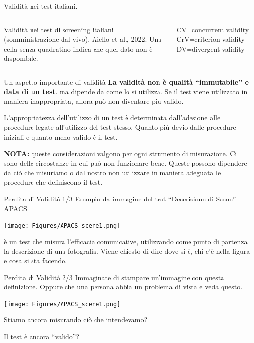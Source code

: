 \documentclass[
  ignorenonframetext,
]{beamer}
\begin{document}
\begin{frame}{Validità nei test italiani.}
\begin{columns}
Validità nei test di screening italiani (somministrazione dal vivo).
Aiello et al., 2022. Una cella senza quadratino indica che quel dato non è disponibile.

\vspace{2em}

CV=concurrent validity
CrV=criterion validity
DV=divergent validity

\end{columns}
\end{frame}

\begin{frame}{Un aspetto importante di validità}
\label{un-aspetto-importante-di-validituxe0}
\textbf{La validità non è qualità “immutabile” e data di un test}. ma
dipende da come lo si utilizza. Se il test viene utilizzato in maniera
inappropriata, allora può non diventare più valido.

L'appropriatezza dell'utilizzo di un test è determinata dall'adesione
alle procedure legate all'utilizzo del test stesso. Quanto più devio
dalle procedure iniziali e quanto meno valido è il test.

\pause

\textbf{NOTA:} queste considerazioni valgono per ogni strumento di
misurazione. Ci sono delle circostanze in cui può non funzionare bene.
Queste possono dipendere da ciò che misuriamo o dal nostro non
utilizzare in maniera adeguata le procedure che definiscono il test.
\end{frame}

\begin{frame}{Perdita di Validità 1/3}
\label{perdita-di-validituxe0-13}
Esempio da immagine del test ``Descrizione di Scene'' - APACS

\begin{center}
\texttt{[image: Figures/APACS\_scene1.png]}
\end{center}

è un test che misura l'efficacia comunicative, utilizzando come punto di
partenza la descrizione di una fotografia. Viene chiesto di dire dove si
è, chi c'è nella figura e cosa si sta facendo.
\end{frame}

\begin{frame}{Perdita di Validità 2/3}
\label{perdita-di-validituxe0-23}
Immaginate di stampare un'immagine con questa definizione. Oppure che
una persona abbia un problema di vista e veda questo.

\begin{center}
\texttt{[image: Figures/APACS\_scene1.png]}
\end{center}

Stiamo ancora misurando ciò che intendevamo?

Il test è ancora ``valido''?
\end{frame}
\end{document}
